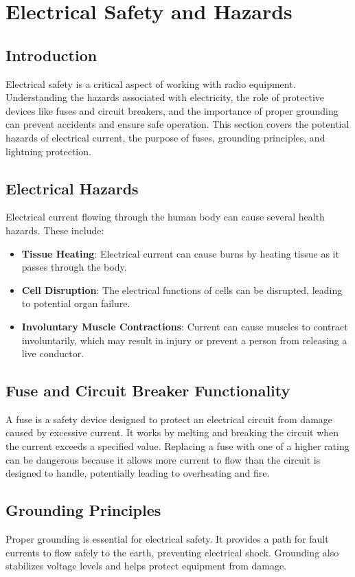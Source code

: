 \section{Electrical Safety and Hazards}
\label{section:electrical_safety}

\subsection*{Introduction}
Electrical safety is a critical aspect of working with radio equipment. Understanding the hazards associated with electricity, the role of protective devices like fuses and circuit breakers, and the importance of proper grounding can prevent accidents and ensure safe operation. This section covers the potential hazards of electrical current, the purpose of fuses, grounding principles, and lightning protection.

\subsection*{Electrical Hazards}
Electrical current flowing through the human body can cause several health hazards. These include:
\begin{itemize}
    \item \textbf{Tissue Heating}: Electrical current can cause burns by heating tissue as it passes through the body.
    \item \textbf{Cell Disruption}: The electrical functions of cells can be disrupted, leading to potential organ failure.
    \item \textbf{Involuntary Muscle Contractions}: Current can cause muscles to contract involuntarily, which may result in injury or prevent a person from releasing a live conductor.
\end{itemize}

\subsection*{Fuse and Circuit Breaker Functionality}
A fuse is a safety device designed to protect an electrical circuit from damage caused by excessive current. It works by melting and breaking the circuit when the current exceeds a specified value. Replacing a fuse with one of a higher rating can be dangerous because it allows more current to flow than the circuit is designed to handle, potentially leading to overheating and fire.

\subsection*{Grounding Principles}
Proper grounding is essential for electrical safety. It provides a path for fault currents to flow safely to the earth, preventing electrical shock. Grounding also stabilizes voltage levels and helps protect equipment from damage.

